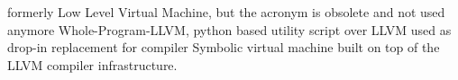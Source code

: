  {formerly Low Level Virtual Machine, but the acronym is obsolete and not used anymore}
 {Whole-Program-LLVM, python based utility script over LLVM used as drop-in replacement for compiler}
 {Symbolic virtual machine built on top of the LLVM compiler infrastructure.}
